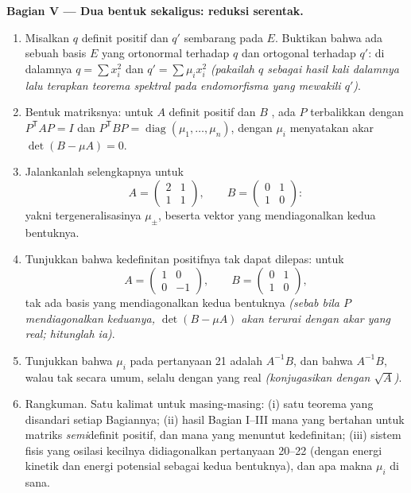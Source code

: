 \begin{problem}
\medskip
\noindent\textbf{Bagian V --- Dua bentuk sekaligus: reduksi
serentak.}
\begin{enumerate}[resume]
  \item Misalkan $q$ definit positif dan $q'$ sembarang
         pada $E$. Buktikan bahwa ada sebuah basis
        $E$ yang ortonormal terhadap $q$ dan ortogonal terhadap
        $q'$: di dalamnya $q = \sum x_i^2$ dan $q' = \sum \mu_i
        x_i^2$ \emph{(pakailah $q$ sebagai hasil kali dalamnya lalu terapkan
        teorema spektral pada endomorfisma yang mewakili
        $q'$)}.
  \item Bentuk matriksnya: untuk $A$ definit positif dan $B$
        , ada $P$ terbalikkan dengan
        $P^{\mathsf T}AP = I$ dan $P^{\mathsf T}BP =
        \operatorname{diag}(\mu_1, \dots, \mu_n)$, dengan
        $\mu_i$ menyatakan akar $\det(B - \mu A) = 0$.
  \item Jalankanlah selengkapnya untuk
        \[
        A = \begin{pmatrix} 2 & 1\\ 1 & 1 \end{pmatrix},
        \qquad
        B = \begin{pmatrix} 0 & 1\\ 1 & 0 \end{pmatrix} :
        \]
        yakni  tergeneralisasinya $\mu_\pm$, beserta vektor
        yang mendiagonalkan kedua bentuknya.
  \item Tunjukkan bahwa kedefinitan positifnya tak dapat dilepas: untuk
        \[
        A = \begin{pmatrix} 1 & 0\\ 0 & -1 \end{pmatrix},
        \qquad
        B = \begin{pmatrix} 0 & 1\\ 1 & 0 \end{pmatrix},
        \]
        tak ada basis yang mendiagonalkan kedua bentuknya \emph{(sebab bila $P$
        mendiagonalkan keduanya, $\det(B - \mu A)$ akan terurai dengan
        akar yang real; hitunglah ia)}.
  \item Tunjukkan bahwa $\mu_i$ pada pertanyaan 21 adalah
         $A^{-1}B$, dan bahwa $A^{-1}B$, walau tak
         secara umum, selalu  dengan
         yang real \emph{(konjugasikan dengan $\sqrt A$)}.
  \item Rangkuman. Satu kalimat untuk masing-masing: (i) satu teorema
        yang disandari setiap Bagiannya; (ii) hasil Bagian
        I--III mana yang bertahan untuk matriks \emph{semi}definit
        positif, dan mana yang menuntut kedefinitan; (iii) sistem
        fisis yang osilasi kecilnya didiagonalkan pertanyaan
        20--22 (dengan energi kinetik dan energi potensial sebagai
        kedua bentuknya), dan apa makna $\mu_i$ di sana.

\end{enumerate}
\end{problem}

